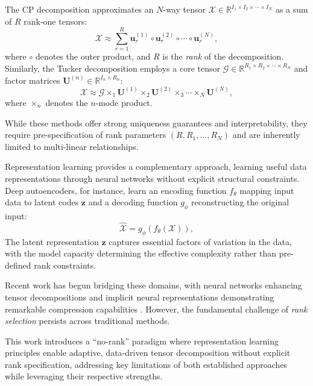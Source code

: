 \documentclass[a4paper,12pt,reqno]{amsart}
\theoremstyle{definition}
\theoremstyle{remark}
\begin{document}
The CP decomposition approximates an $N$-way tensor $\mathcal{X} \in \mathbb{R}^{I_1 \times I_2 \times \cdots \times I_N}$ as a sum of $R$ rank-one tensors:
\begin{equation}
\mathcal{X} \approx \sum_{r=1}^{R} \mathbf{u}_r^{(1)} \circ \mathbf{u}_r^{(2)} \circ \cdots \circ \mathbf{u}_r^{(N)},
\end{equation}
where $\circ$ denotes the outer product, and $R$ is the \textit{rank} of the decomposition. Similarly, the Tucker decomposition employs a core tensor $\mathcal{G} \in \mathbb{R}^{R_1 \times R_2 \times \cdots \times R_N}$ and factor matrices $\mathbf{U}^{(n)} \in \mathbb{R}^{I_n \times R_n}$:
\begin{equation}
\mathcal{X} \approx \mathcal{G} \times_1 \mathbf{U}^{(1)} \times_2 \mathbf{U}^{(2)} \times_3 \cdots \times_N \mathbf{U}^{(N)},
\end{equation}
where $\times_n$ denotes the $n$-mode product.

While these methods offer strong uniqueness guarantees \cite{kruskal1977three} and interpretability, they require pre-specification of rank parameters $(R, R_1, \dots, R_N)$ and are inherently limited to multi-linear relationships.

Representation learning \cite{bengio2013representation} provides a complementary approach, learning useful data representations through neural networks without explicit structural constraints. Deep autoencoders, for instance, learn an encoding function $f_\theta$ mapping input data to latent codes $\mathbf{z}$ and a decoding function $g_\phi$ reconstructing the original input:
\begin{equation}
\mathcal{\hat{X}} = g_\phi(f_\theta(\mathcal{X})),
\end{equation}
The latent representation $\mathbf{z}$ captures essential factors of variation in the data, with the model capacity determining the effective complexity rather than pre-defined rank constraints.

Recent work has begun bridging these domains, with neural networks enhancing tensor decompositions  and implicit neural representations demonstrating remarkable compression capabilities \cite{tancik2020fourier}. However, the fundamental challenge of \textit{rank selection} persists across traditional methods. 


This work introduces a ``no-rank'' paradigm where representation learning principles enable adaptive, data-driven tensor decomposition without explicit rank specification, addressing key limitations of both established approaches while leveraging their respective strengths.
\end{document}
